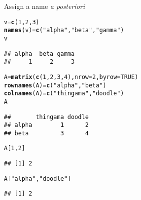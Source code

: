 \documentclass[aspectratio=169]{beamer}\usepackage[]{graphicx}\usepackage[]{xcolor}
\makeatletter
\newcommand{\hlnum}[1]{\textcolor[rgb]{0.686,0.059,0.569}{#1}}%
\newcommand{\hlsng}[1]{\textcolor[rgb]{0.192,0.494,0.8}{#1}}%
\newcommand{\hldef}[1]{\textcolor[rgb]{0.345,0.345,0.345}{#1}}%
\newcommand{\hlkwb}[1]{\textcolor[rgb]{0.69,0.353,0.396}{#1}}%
\newcommand{\hlkwc}[1]{\textcolor[rgb]{0.333,0.667,0.333}{#1}}%
\newcommand{\hlkwd}[1]{\textcolor[rgb]{0.737,0.353,0.396}{\textbf{#1}}}%
\newenvironment{kframe}{%
 \def\at@end@of@kframe{}%
 \ifinner\ifhmode%
  \def\at@end@of@kframe{\end{minipage}}%
  \begin{minipage}{\columnwidth}%
 \fi\fi%
 \def\FrameCommand##1{\hskip\@totalleftmargin \hskip-\fboxsep
 \colorbox{shadecolor}{##1}\hskip-\fboxsep
     \hskip-\linewidth \hskip-\@totalleftmargin \hskip\columnwidth}%
 \MakeFramed {\advance\hsize-\width
   \@totalleftmargin\z@ \linewidth\hsize
   \@setminipage}}%
 {\par\unskip\endMakeFramed%
 \at@end@of@kframe}
\newenvironment{knitrout}{}{} %
\makeatother
\begin{document}
\begin{frame}[fragile]{Assign a name \emph{a posteriori}}
\begin{knitrout}
\color{fgcolor}\begin{kframe}
\begin{alltt}
\hldef{v} \hlkwb{=} \hlkwd{c}\hldef{(}\hlnum{1}\hldef{,}\hlnum{2}\hldef{,}\hlnum{3}\hldef{)}
\hlkwd{names}\hldef{(v)} \hlkwb{=} \hlkwd{c}\hldef{(}\hlsng{"alpha"}\hldef{,} \hlsng{"beta"}\hldef{,} \hlsng{"gamma"}\hldef{)}
\hldef{v}
\end{alltt}
\begin{verbatim}
## alpha  beta gamma 
##     1     2     3
\end{verbatim}
\end{kframe}
\end{knitrout}
\end{frame}

\begin{frame}[fragile]
\begin{knitrout}
\color{fgcolor}\begin{kframe}
\begin{alltt}
\hldef{A} \hlkwb{=} \hlkwd{matrix}\hldef{(}\hlkwd{c}\hldef{(}\hlnum{1}\hldef{,}\hlnum{2}\hldef{,}\hlnum{3}\hldef{,}\hlnum{4}\hldef{),} \hlkwc{nrow} \hldef{=} \hlnum{2}\hldef{,} \hlkwc{byrow} \hldef{=} \hlnum{TRUE}\hldef{)}
\hlkwd{rownames}\hldef{(A)} \hlkwb{=} \hlkwd{c}\hldef{(}\hlsng{"alpha"}\hldef{,}\hlsng{"beta"}\hldef{)}
\hlkwd{colnames}\hldef{(A)} \hlkwb{=} \hlkwd{c}\hldef{(}\hlsng{"thingama"}\hldef{,}\hlsng{"doodle"}\hldef{)}
\hldef{A}
\end{alltt}
\begin{verbatim}
##       thingama doodle
## alpha        1      2
## beta         3      4
\end{verbatim}
\begin{alltt}
\hldef{A[}\hlnum{1}\hldef{,}\hlnum{2}\hldef{]}
\end{alltt}
\begin{verbatim}
## [1] 2
\end{verbatim}
\begin{alltt}
\hldef{A[}\hlsng{"alpha"}\hldef{,}\hlsng{"doodle"}\hldef{]}
\end{alltt}
\begin{verbatim}
## [1] 2
\end{verbatim}
\end{kframe}
\end{knitrout}
\end{frame}
\end{document}
